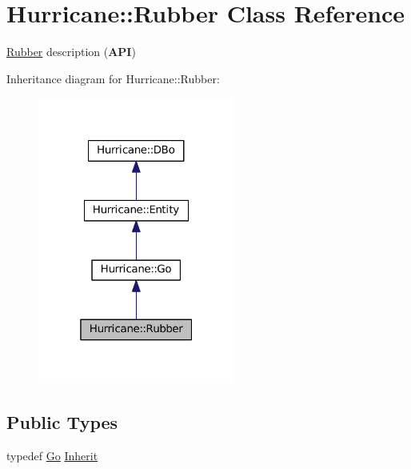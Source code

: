 \hypertarget{classHurricane_1_1Rubber}{}\section{Hurricane\+:\+:Rubber Class Reference}
\label{classHurricane_1_1Rubber}


\mbox{\hyperlink{classHurricane_1_1Rubber}{Rubber}} description ({\bfseries A\+PI})  




Inheritance diagram for Hurricane\+:\+:Rubber\+:\nopagebreak
\begin{figure}[H]
\begin{center}
\leavevmode
\includegraphics[width=184pt]{classHurricane_1_1Rubber__inherit__graph}
\end{center}
\end{figure}
\subsection*{Public Types}
\begin{DoxyCompactItemize}
\item 
typedef \mbox{\hyperlink{classHurricane_1_1Go}{Go}} \mbox{\hyperlink{classHurricane_1_1Rubber_aa74649cee7cda714020e77194af2210a}{Inherit}}
\end{DoxyCompactItemize}
